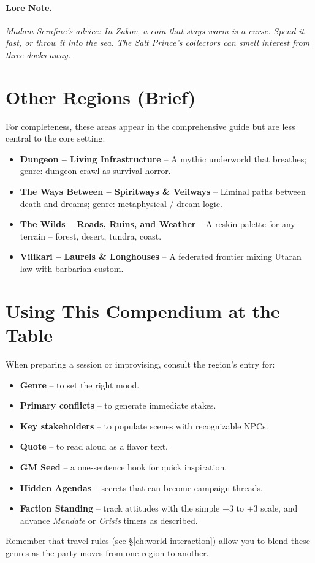 \paragraph{Lore Note.}
\emph{Madam Serafine's advice: \textquotedbl In Zakov, a coin that stays warm is a curse. Spend it fast, or throw it into the sea. The Salt Prince's collectors can smell interest from three docks away.\textquotedbl}

\section{Other Regions (Brief)}
For completeness, these areas appear in the comprehensive guide but are less central to the core setting:

\begin{itemize}
  \item \textbf{Dungeon -- \textquotedbl Living Infrastructure\textquotedbl} -- A mythic underworld that breathes; genre: dungeon crawl as survival horror.
  \item \textbf{The Ways Between -- \textquotedbl Spiritways \& Veilways\textquotedbl} -- Liminal paths between death and dreams; genre: metaphysical / dream-logic.
  \item \textbf{The Wilds -- \textquotedbl Roads, Ruins, and Weather\textquotedbl} -- A reskin palette for any terrain -- forest, desert, tundra, coast.
  \item \textbf{Vilikari -- \textquotedbl Laurels \& Longhouses\textquotedbl} -- A federated frontier mixing Utaran law with barbarian custom.
\end{itemize}

\section{Using This Compendium at the Table}

When preparing a session or improvising, consult the region's entry for:
\begin{itemize}
  \item \textbf{Genre} -- to set the right mood.
  \item \textbf{Primary conflicts} -- to generate immediate stakes.
  \item \textbf{Key stakeholders} -- to populate scenes with recognizable NPCs.
  \item \textbf{Quote} -- to read aloud as a flavor text.
  \item \textbf{GM Seed} -- a one-sentence hook for quick inspiration.
  \item \textbf{Hidden Agendas} -- secrets that can become campaign threads.
  \item \textbf{Faction Standing} -- track attitudes with the simple \(-3\) to \(+3\) scale, and advance \textit{Mandate} or \textit{Crisis} timers as described.
\end{itemize}

Remember that travel rules (see \S\ref{ch:world-interaction}) allow you to blend these genres as the party moves from one region to another.